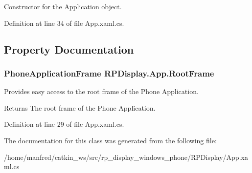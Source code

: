 \-Constructor for the \-Application object. 



\-Definition at line 34 of file \-App.\-xaml.\-cs.



\subsection{\-Property \-Documentation}
\hypertarget{class_r_p_display_1_1_app_af5224c6c5df7497a93d8d0ba2e986b1d}{
\subsubsection[{\-Root\-Frame}]{\setlength{\rightskip}{0pt plus 5cm}\-Phone\-Application\-Frame {\bf \-R\-P\-Display.\-App.\-Root\-Frame}}}\label{class_r_p_display_1_1_app_af5224c6c5df7497a93d8d0ba2e986b1d}


\-Provides easy access to the root frame of the \-Phone \-Application. 

\begin{DoxyReturn}{\-Returns}
\-The root frame of the \-Phone \-Application.
\end{DoxyReturn}


\-Definition at line 29 of file \-App.\-xaml.\-cs.



\-The documentation for this class was generated from the following file\-:\begin{DoxyCompactItemize}
\item 
/home/manfred/catkin\-\_\-ws/src/rp\-\_\-display\-\_\-windows\-\_\-phone/\-R\-P\-Display/\-App.\-xaml.\-cs\end{DoxyCompactItemize}
